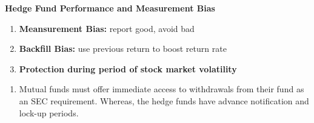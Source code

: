 \documentclass[11pt,fleqn]{report} %
\numberwithin{equation}{section} %
\numberwithin{figure}{section} %
\numberwithin{table}{section} %
\begin{document}
\begin{definition}\textbf{Hedge Fund Performance and Measurement Bias}
\begin{enumerate}
    \item \textbf{Meansurement Bias:} report good, avoid bad
    \item \textbf{Backfill Bias:} use previous return to boost return rate
    \item \textbf{Protection during period of stock market volatility}
\end{enumerate}
\end{definition}
\begin{remark}
\begin{enumerate}
    \item Mutual funds must offer immediate access to withdrawals from their fund as an SEC requirement. Whereas, the hedge funds have advance notification and lock-up periods.
\end{enumerate}
\end{remark}

\end{document}
